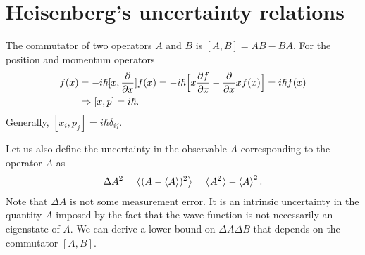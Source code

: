 \section{Heisenberg's uncertainty relations}

The commutator of two operators $A$ and $B$ is $[A,B] = AB - BA$.
For the position and momentum operators
\begin{align}
    [x,p] f(x) &= -i\hbar [x,\pdv{x}] f(x) = -i \hbar \Big[ x \pdv{f}{x} - \pdv{x} x f(x) \Big] = i\hbar f(x) \\
               &\Rightarrow [x,p] = i\hbar
.\end{align}
Generally, $[x_{i},p_{j}] = i\hbar \delta_{ij}$.

Let us also define the uncertainty in the observable $A$ corresponding to the operator $A$ as
\begin{eqnarray}
    \Delta A^2 = \expval{(A - \expval{A})^2} = \expval{A^2} - \expval{A}^2
.\end{eqnarray}
Note that $\Delta A$ is not some measurement error.
It is an intrinsic uncertainty in the quantity $A$ imposed by the fact that the wave-function is not necessarily an eigenstate of $A$.
We can derive a lower bound on $\Delta A \Delta B$ that depends on the commutator $[A,B]$.

